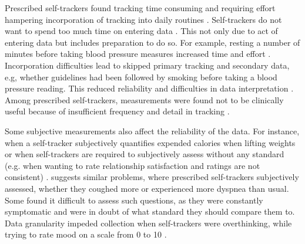 Prescribed self-trackers found tracking time consuming and requiring effort \citep{Ancker2015} hampering incorporation of tracking into daily routines \citep{Verdezoto2015, Ancker2015}. Self-trackers do not want to spend too much time on entering data \citep{Choe2013, Li2010}. This not only due to act of entering data but includes preparation to do so. For example, resting a number of minutes before taking blood pressure measures increased time and effort \citep{Verdezoto2015}. Incorporation difficulties lead to skipped primary tracking and secondary data, e.g, whether guidelines had been followed by  smoking before taking a blood pressure reading. This reduced reliability and difficulties in data interpretation \citep{Verdezoto2015}. Among prescribed self-trackers, measurements were found not to be clinically useful because of insufficient frequency and detail in tracking \citep{Chung2015}. 

Some subjective measurements also affect the reliability of the data. For instance, when a self-tracker subjectively quantifies expended calories when lifting weights or when self-trackers are required to subjectively assess without any standard (e.g. when wanting to rate relationship satisfaction and ratings are not consistent) \citep{Li2010}. \citep{piloting} suggests similar problems, where prescribed self-trackers subjectively assessed, whether they coughed more or experienced more dyspnea than usual. Some found it difficult to assess such questions, as they were constantly symptomatic and were in doubt of what standard they should compare them to. Data granularity impeded collection when self-trackers were overthinking, while trying to rate mood on a scale from 0 to 10 \citep{Oh2015}. 

